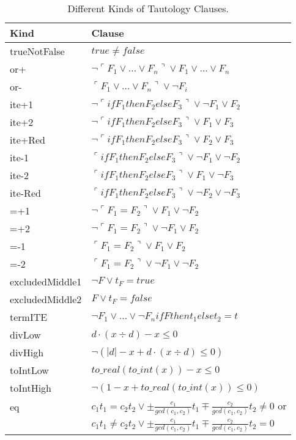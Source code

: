 \documentclass[a4paper]{article}
\newcommand\quoted[1]{\ulcorner #1 \urcorner}
\begin{document}
\begin{table}[htbp]
  \begin{tabular}{l|l}
    Kind & Clause\\\hline
    trueNotFalse & $true\neq false$\\
    or+ & $\neg\quoted{F_1\lor \ldots \lor F_n}\lor F_1\lor \ldots\lor F_n$\\
    or- & $\quoted{F_1\lor \ldots \lor F_n}\lor \neg F_i$\\
    ite+1 & $\neg\quoted{if F_1 then F_2 else F_3}\lor\neg F_1\lor F_2$\\
    ite+2 & $\neg\quoted{if F_1 then F_2 else F_3}\lor F_1\lor F_3$\\
    ite+Red & $\neg\quoted{if F_1 then F_2 else F_3}\lor F_2\lor F_3$\\
    ite-1 & $\quoted{if F_1 then F_2 else F_3}\lor\neg F_1\lor\neg F_2$\\
    ite-2 & $\quoted{if F_1 then F_2 else F_3}\lor F_1\lor\neg F_3$\\
    ite-Red & $\quoted{if F_1 then F_2 else F_3}\lor\neg F_2\lor\neg F_3$\\
    =+1 & $\neg\quoted{F_1=F_2}\lor F_1\lor\neg F_2$\\
    =+2 & $\neg\quoted{F_1=F_2}\lor\neg F_1\lor F_2$\\
    =-1 & $\quoted{F_1=F_2}\lor F_1\lor F_2$\\
    =-2 & $\quoted{F_1=F_2}\lor\neg F_1\lor\neg F_2$\\
    excludedMiddle1 & $\neg F\lor t_F = true$\\
    excludedMiddle2 & $F\lor t_F = false$\\
    termITE & $\neg F_1\lor\ldots\lor\neg F_n if F then t_1 else t_2 = t$\\
    divLow & $d\cdot (x\div d) - x \leq 0$\\
    divHigh & $\neg (|d| - x + d\cdot (x\div d)\leq 0)$\\
    toIntLow & $to\_real(to\_int(x)) - x \leq 0$\\
    toIntHigh & $\neg (1 - x + to\_real(to\_int(x))\leq 0)$\\
    eq & $c_1t_1=c_2t_2\lor
    \pm\frac{c_1}{gcd(c_1,c_2)}t_1\mp\frac{c_2}{gcd(c_1,c_2)}t_2\neq 0$ or\\
    &$c_1t_1\neq c_2t_2\lor \pm\frac{c_1}{gcd(c_1,c_2)}t_1\mp\frac{c_2}{gcd(c_1,c_2)}t_2=0$
  \end{tabular}
  \caption{\label{tab:tautforms}Different Kinds of Tautology Clauses.}
\end{table}
\end{document}
